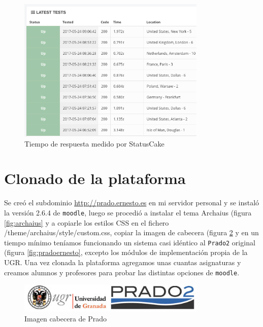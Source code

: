 \begin{figure}[H]
\centering
\includegraphics[width=0.8\textwidth]{../screenshots/statuscake2}
\caption{Tiempo de respuesta medido por StatusCake}
\label{fig:statuscake2}
\end{figure}


\section{Clonado de la plataforma}

Se creó el subdominio \url{http://prado.ernesto.es} en mi servidor personal y se instaló la versión 2.6.4 de \texttt{moodle}, luego se procedió a instalar el tema Archaius  (figura \ref{fig:archaius} y a copiarle los estilos CSS en el fichero /theme/archaius/style/custom.css, copiar la imagen de cabecera (figura \ref{fig:cabeceraprado} y en un tiempo mínimo teníamos funcionando un sistema casi idéntico al \texttt{Prado2} original (figura \ref{fig:pradoernesto}, excepto los módulos de implementación propia de la UGR. Una vez clonada la plataforma agregamos unas cuantas asignaturas y creamos alumnos y profesores para probar las distintas opciones de \texttt{moodle}.

\begin{figure}[H]
\centering
\includegraphics[width=0.8\textwidth]{../screenshots/cabeceraprado}
\caption{Imagen cabecera de Prado}
\label{fig:cabeceraprado}
\end{figure}

